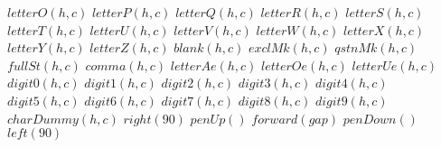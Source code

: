 \documentclass[a4paper,10pt]{article}
\begin{document}
\begin{algorithm}
\begin{algorithmic}[5]
      \STATE \(letterO(h,c)\)
      \STATE \(letterP(h,c)\)
      \STATE \(letterQ(h,c)\)
      \STATE \(letterR(h,c)\)
      \STATE \(letterS(h,c)\)
      \STATE \(letterT(h,c)\)
      \STATE \(letterU(h,c)\)
      \STATE \(letterV(h,c)\)
      \STATE \(letterW(h,c)\)
      \STATE \(letterX(h,c)\)
      \STATE \(letterY(h,c)\)
      \STATE \(letterZ(h,c)\)
      \STATE \(blank(h,c)\)
      \STATE \(exclMk(h,c)\)
      \STATE \(qstnMk(h,c)\)
      \STATE \(fullSt(h,c)\)
      \STATE \(comma(h,c)\)
      \STATE \(letterAe(h,c)\)
      \STATE \(letterOe(h,c)\)
      \STATE \(letterUe(h,c)\)
      \STATE \(digit0(h,c)\)
      \STATE \(digit1(h,c)\)
      \STATE \(digit2(h,c)\)
      \STATE \(digit3(h,c)\)
      \STATE \(digit4(h,c)\)
      \STATE \(digit5(h,c)\)
      \STATE \(digit6(h,c)\)
      \STATE \(digit7(h,c)\)
      \STATE \(digit8(h,c)\)
      \STATE \(digit9(h,c)\)
    \ELSE
      \STATE \(charDummy(h,c)\)
    \ENDIF
    \STATE \(right(90)\)
    \STATE \(penUp()\)
    \STATE \(forward(gap)\)
    \STATE \(penDown()\)
    \STATE \(left(90)\)
  \ENDFOR

\end{algorithmic}
\end{algorithm}


\STATE {}
\end{document}
